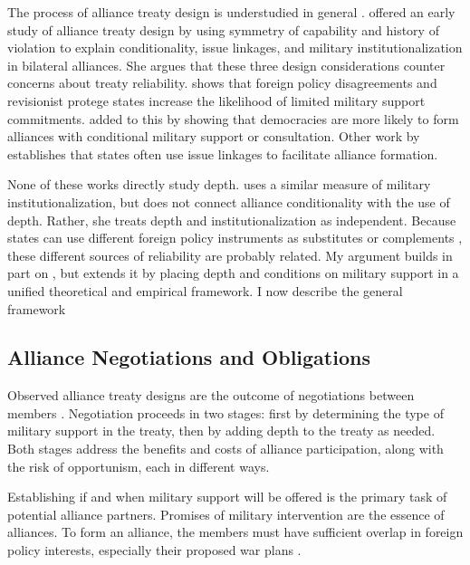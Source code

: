 \documentclass[12pt]{article}
\begin{document}
The process of alliance treaty design is understudied in general \citep{Poast2019a}. 
\citet{Mattes2012} offered an early study of alliance treaty design by using symmetry of capability and history of violation to explain conditionality, issue linkages, and military institutionalization in bilateral alliances. 
She argues that these three design considerations counter concerns about treaty reliability. 
\citet{Benson2012} shows that foreign policy disagreements and revisionist protege states increase the likelihood of limited military support commitments. 
\citep{Chibaetal2015} added to this by showing that democracies are more likely to form alliances with conditional military support or consultation. 
Other work by \citet{Poast2012, Poast2013} establishes that states often use issue linkages to facilitate alliance formation. 


None of these works directly study depth. 
\citet{Mattes2012} uses a similar measure of military institutionalization, but does not connect alliance conditionality with the use of depth. 
Rather, she treats depth and institutionalization as independent. 
Because states can use different foreign policy instruments as substitutes or complements \citep{Starr2000, MorganPalmer2000}, these different sources of reliability are probably related. 
My argument builds in part on \citet{Mattes2012}, but extends it by placing depth and conditions on military support in a unified theoretical and empirical framework. 
I now describe the general framework 

\subsection{Alliance Negotiations and Obligations}

Observed alliance treaty designs are the outcome of negotiations between members \citep{Poast2019a}.  
Negotiation proceeds in two stages: first by determining the type of military support in the treaty, then by adding depth to the treaty as needed. 
Both stages address the benefits and costs of alliance participation, along with the risk of opportunism, each in different ways. 


Establishing if and when military support will be offered is the primary task of potential alliance partners. 
Promises of military intervention are the essence of alliances. 
To form an alliance, the members must have sufficient overlap in foreign policy interests, especially their proposed war plans \citep{Morrow1991, Smith1995, FordhamPoast2014, Poast2019a}.  
\end{document}
